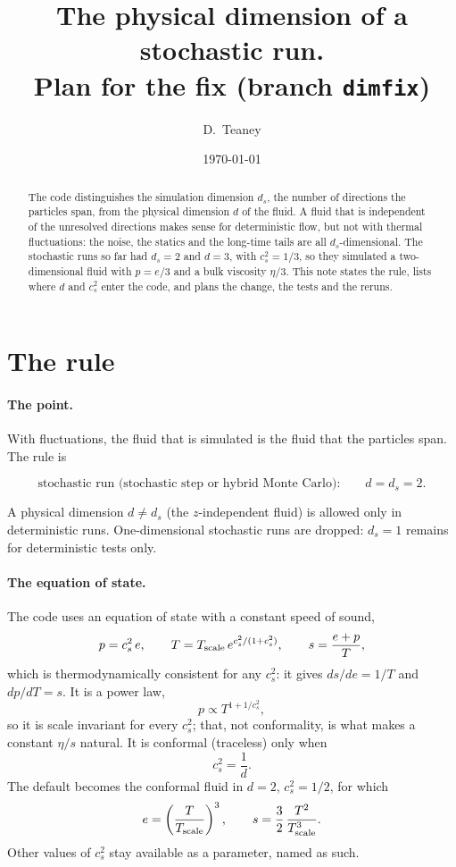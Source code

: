 \documentclass[11pt,aps,preprint,nofootinbib,superscriptaddress,tightenlines]{revtex4-2}
\def\st{\begin{equation}}
\def\stp{\end{equation}}
\let\oldparagraph\paragraph
\renewcommand{\paragraph}{\par\bigskip\oldparagraph}
\begin{document}
\title{The physical dimension of a stochastic run.\\ Plan for the fix (branch \texttt{dimfix})}
\author{D.~Teaney}
\date{\today}

\begin{abstract}
The code distinguishes the simulation dimension $d_s$, the number of directions the particles span, from the physical dimension $d$ of
the fluid.  A fluid that is independent of the unresolved directions makes sense for deterministic flow, but not with thermal
fluctuations: the noise, the statics and the long-time tails are all $d_s$-dimensional.  The stochastic runs so far had $d_s=2$ and
$d=3$, with $c_s^2=1/3$, so they simulated a two-dimensional fluid with $p=e/3$ and a bulk viscosity $\eta/3$.  This note states the rule,
lists where $d$ and $c_s^2$ enter the code, and plans the change, the tests and the reruns.
\end{abstract}
\maketitle

\section{The rule}

\paragraph{The point.}  With fluctuations, the fluid that is simulated is the fluid that the particles span.  The rule is
\begin{keyeq}
\st
\text{stochastic run (stochastic step or hybrid Monte Carlo):}\qquad d=d_s=2 .
\label{rule}
\stp
\end{keyeq}
A physical dimension $d\neq d_s$ (the $z$-independent fluid) is allowed only in deterministic runs.  One-dimensional stochastic runs are
dropped: $d_s=1$ remains for deterministic tests only.

\paragraph{The equation of state.}  The code uses an equation of state with a constant speed of sound,
\st
p=c_s^2\,e,\qquad T=T_{\rm scale}\,e^{c_s^2/(1+c_s^2)},\qquad s=\frac{e+p}{T},
\label{eos}
\stp
which is thermodynamically consistent for any $c_s^2$: it gives $ds/de=1/T$ and $dp/dT=s$.  It is a power law,
\st
p\propto T^{1+1/c_s^2},
\stp
so it is scale invariant for every $c_s^2$; that, not conformality, is what makes a constant $\eta/s$ natural.  It is conformal
(traceless) only when
\st
c_s^2=\frac1d .
\label{conformal}
\stp
The default becomes the conformal fluid in $d=2$, $c_s^2=1/2$, for which
\st
e=\left(\frac{T}{T_{\rm scale}}\right)^{3},\qquad s=\frac32\,\frac{T^2}{T_{\rm scale}^3} .
\stp
Other values of $c_s^2$ stay available as a parameter, named as such.
\end{document}
